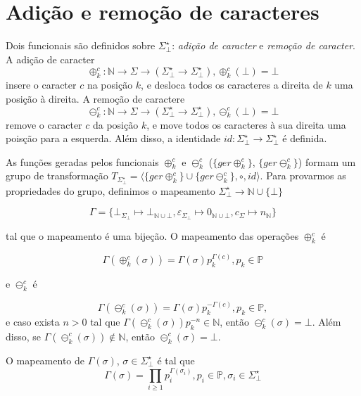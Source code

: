 \documentclass[a4paper]{article}
\newcommand{\baseset}{{\Sigma^\star_\bot}}
\newcommand{\opa}{{\oplus^c_k}}
\newcommand{\gopa}{{\{ger\opa\}}}
\newcommand{\opb}{{\ominus^c_k}}
\newcommand{\gopb}{{\{ger\opb\}}}
\newcommand{\transMon}{{T_\baseset}}
\newcommand{\composition}{{\circ}}
\begin{document}
\section*{Adição e remoção de caracteres}
Dois funcionais são definidos sobre $\baseset$: {\it adição de caracter} e {\it remoção de caracter}. A adição de caracter
\begin{equation} \label{eq:oplus}
\opa: \mathbb{N} \to \Sigma \to (\baseset \to \baseset), \opa(\bot) = \bot
\end{equation}
insere o caracter $c$ na posição $k$, e desloca todos os caracteres a direita de $k$ uma posição à direita. A remoção de caractere
\begin{equation} \label{eq:ominus}
\opb: \mathbb{N} \to \Sigma \to (\baseset \to \baseset), \opb(\bot) = \bot
\end{equation}
remove o caracter $c$ da posição $k$, e move todos os caracteres à sua direita uma poisção para a esquerda. Além disso, a identidade $id: \baseset \to \baseset$ é definida.

As funções geradas pelos funcionais $\opa$ e $\opb$ ($\gopa$, $\gopb$) formam um grupo de transformação $\transMon = \langle\gopa \cup \gopb, \composition, id\rangle$. Para provarmos as propriedades do grupo, definimos o mapeamento $\baseset \to \mathbb{N} \cup \{\bot\}$

\begin{equation} \label{map:set}
\Gamma = \{ \bot_{\Sigma_\bot} \mapsto \bot_{\mathbb{N}\cup \bot}, \varepsilon_{\Sigma_\bot} \mapsto 0_{\mathbb{N}\cup \bot}, c_{\Sigma} \mapsto n_{\mathbb{N}}\}
\end{equation}

tal que o mapeamento é uma bijeção. O mapeamento das operações $\opa$ é

\begin{equation} \label{map:opa}
\Gamma(\opa(\sigma)) = \Gamma(\sigma) p_k^{\Gamma(c)}, p_k \in \mathbb{P}
\end{equation}

e $\opb$ é

\begin{equation} \label{map:opb}
\Gamma(\opb(\sigma)) = \Gamma(\sigma) p_k^{-\Gamma(c)}, p_k \in \mathbb{P},
\end{equation}
e caso exista $n > 0$ tal que $\Gamma(\opb(\sigma)) p_k^{-n} \in \mathbb{N}$, então $\opb(\sigma) = \bot$. Além disso, se $\Gamma(\opb(\sigma)) \notin \mathbb{N}$, então $\opb(\sigma) = \bot$. 

O mapeamento de $\Gamma(\sigma)$, $\sigma \in \baseset$ é tal que
\begin{equation} \label{map:sigma}
\Gamma(\sigma) = \prod_{i \ge 1} p_i^{\Gamma(\sigma_i)}, p_i \in \mathbb{P}, \sigma_i \in \baseset
\end{equation}
\end{document}
